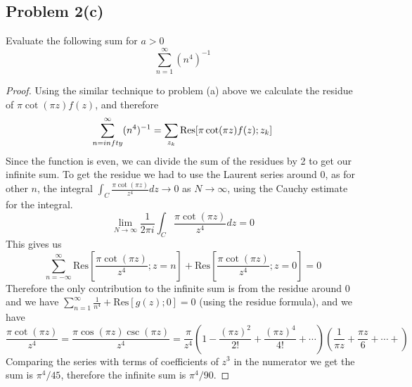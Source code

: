 \documentclass{article}[12pt]
\begin{document}
\subsection*{Problem 2(c)} Evaluate the following sum for $a>0$
\[
\sum_{n=1}^\infty (n^4)^{-1}
\]
\begin{proof}
  Using the similar technique to problem (a) above we calculate the residue
  of $\pi\cot(\pi z)f(z)$, and therefore
  \[
  \sum_{n=\-infty}^\infty (n^4)^{-1} = \sum_{z_k} \mbox{Res} [\pi\cot(\pi z)f(z); z_k]
  \]
  Since the function is even, we can divide the sum of the residues by 2 to
  get our infinite sum. To get the residue we had to use the Laurent series
  around 0, as for other $n$, the integral $\int_C \frac{\pi \cot(\pi z)}{z^4}dz \to 0$
  as $N\to\infty$, using the Cauchy estimate for the integral.
  \[
  \lim_{N\to\infty} \frac{1}{2\pi i} \int_C \frac{\pi \cot(\pi z)}{z^4} dz = 0
  \]
  This gives us
  \[
  \sum_{n=-\infty}^\infty \mbox{Res}[\frac{\pi \cot(\pi z)}{z^4}; z=n] +
  \mbox{Res}[\frac{\pi\cot(\pi z)}{z^4}; z=0] = 0
  \]
  Therefore the
  only contribution to the infinite sum is from the residue around 0
  and we have $\sum_{n=1}^\infty \frac{1}{n^4} + \mbox{Res} [g(z);0] = 0$ (using
  the residue formula),
  and we have
  \[
  \frac{\pi \cot(\pi z)}{z^4} = \frac{\pi \cos(\pi z)\csc(\pi z)}{z^4} =
  \frac{\pi}{z^4}\left( 1-\frac{(\pi z)^2}{2!} +\frac{(\pi z)^4}{4!} + \cdots\right)
  \left(\frac{1}{\pi z} + \frac{\pi z}{6}+\cdots+\right)
    \]
    Comparing the series with terms of coefficients of $z^3$ in the numerator we get
    the sum is $\pi^4/45$, therefore the infinite sum is $\pi^4/90$.
  
\end{proof}
\end{document}
